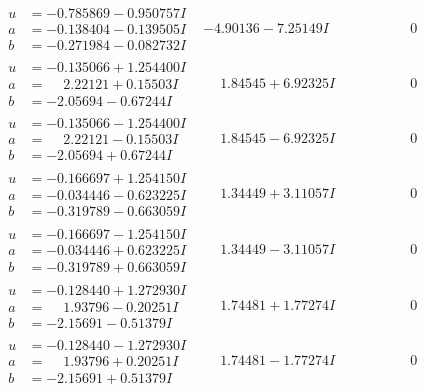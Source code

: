 \documentclass[1p]{elsarticle_modified}
\theoremstyle{definition}
\begin{document}
$$\begin{array}{c|c|c}
\begin{aligned}
u &= -0.785869 - 0.950757 I \\
a &= -0.138404 - 0.139505 I \\
b &= -0.271984 - 0.082732 I\end{aligned}
 & -4.90136 - 7.25149 I & \phantom{-0.000000 } 0 \\ \hline\begin{aligned}
u &= -0.135066 + 1.254400 I \\
a &= \phantom{-}2.22121 + 0.15503 I \\
b &= -2.05694 - 0.67244 I\end{aligned}
 & \phantom{-}1.84545 + 6.92325 I & \phantom{-0.000000 } 0 \\ \hline\begin{aligned}
u &= -0.135066 - 1.254400 I \\
a &= \phantom{-}2.22121 - 0.15503 I \\
b &= -2.05694 + 0.67244 I\end{aligned}
 & \phantom{-}1.84545 - 6.92325 I & \phantom{-0.000000 } 0 \\ \hline\begin{aligned}
u &= -0.166697 + 1.254150 I \\
a &= -0.034446 - 0.623225 I \\
b &= -0.319789 - 0.663059 I\end{aligned}
 & \phantom{-}1.34449 + 3.11057 I & \phantom{-0.000000 } 0 \\ \hline\begin{aligned}
u &= -0.166697 - 1.254150 I \\
a &= -0.034446 + 0.623225 I \\
b &= -0.319789 + 0.663059 I\end{aligned}
 & \phantom{-}1.34449 - 3.11057 I & \phantom{-0.000000 } 0 \\ \hline\begin{aligned}
u &= -0.128440 + 1.272930 I \\
a &= \phantom{-}1.93796 - 0.20251 I \\
b &= -2.15691 - 0.51379 I\end{aligned}
 & \phantom{-}1.74481 + 1.77274 I & \phantom{-0.000000 } 0 \\ \hline\begin{aligned}
u &= -0.128440 - 1.272930 I \\
a &= \phantom{-}1.93796 + 0.20251 I \\
b &= -2.15691 + 0.51379 I\end{aligned}
 & \phantom{-}1.74481 - 1.77274 I & \phantom{-0.000000 } 0 \\ \hline\begin{aligned}

\end{aligned}
\end{array}$$
\end{document}
